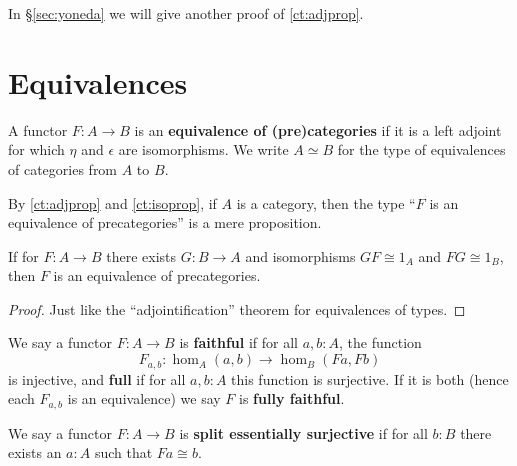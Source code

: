\documentclass{amsart}
\theoremstyle{definition}
\theoremstyle{remark}
\numberwithin{equation}{section}
\begin{document}
In \S\ref{sec:yoneda} we will give another proof of \autoref{ct:adjprop}.


\section{Equivalences}
\label{sec:equivalences}

\begin{defn}
  A functor $F:A\to B$ is an \textbf{equivalence of (pre)categories} if it is a left adjoint for which $\eta$ and $\epsilon$ are isomorphisms.
  We write $A\simeq B$ for the type of equivalences of categories from $A$ to $B$.
\end{defn}

By \autoref{ct:adjprop} and \autoref{ct:isoprop}, if $A$ is a category, then the type ``$F$ is an equivalence of precategories'' is a mere proposition.

\begin{lem}\label{ct:adjointification}
  If for $F:A\to B$ there exists $G:B\to A$ and isomorphisms $GF\cong 1_A$ and $FG\cong 1_B$, then $F$ is an equivalence of precategories.
\end{lem}
\begin{proof}
  Just like the ``adjointification'' theorem for equivalences of types.
\end{proof}

\begin{defn}
  We say a functor $F:A\to B$ is \textbf{faithful} if for all $a,b:A$, the function
  \[F_{a,b}:\hom_A(a,b) \to \hom_B(Fa,Fb)\]
  is injective, and \textbf{full} if for all $a,b:A$ this function is surjective.
  If it is both (hence each $F_{a,b}$ is an equivalence) we say $F$ is \textbf{fully faithful}.
\end{defn}

\begin{defn}
  We say a functor $F:A\to B$ is \textbf{split essentially surjective} if for all $b:B$ there exists an $a:A$ such that $Fa\cong b$.
\end{defn}
\end{document}
